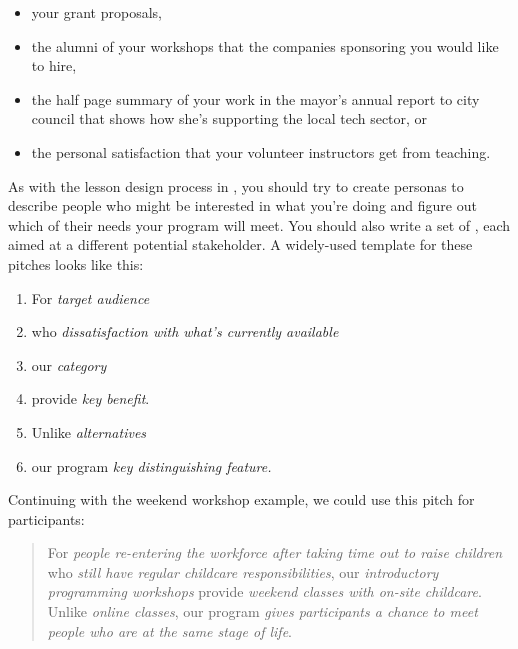 \begin{itemize}

\item
  your grant proposals,

\item
  the alumni of your workshops that the companies sponsoring you would
  like to hire,

\item
  the half page summary of your work in the mayor's annual report to
  city council that shows how she's supporting the local tech sector, or

\item
  the personal satisfaction that your volunteer instructors get from
  teaching.

\end{itemize}

As with the lesson design process in , you should
try to create personas to describe people who might be interested in
what you're doing and figure out which of their needs your program
will meet. You should also write a set of
, each aimed at a
different potential stakeholder. A widely-used template for these
pitches looks like this:

\begin{enumerate}
\item
  For \emph{target audience}
\item
  who \emph{dissatisfaction with what's currently available}
\item
  our \emph{category}
\item
  provide \emph{key benefit}.
\item
  Unlike \emph{alternatives}
\item
  our program \emph{key distinguishing feature.}
\end{enumerate}

\noindent
Continuing with the weekend workshop example, we could use this
pitch for participants:

\begin{quote}

  For \emph{people re-entering the workforce after taking time out to
    raise children} who \emph{still have regular childcare
    responsibilities}, our \emph{introductory programming workshops}
  provide \emph{weekend classes with on-site childcare}. Unlike
  \emph{online classes}, our program \emph{gives participants a chance
    to meet people who are at the same stage of life}.

\end{quote}

